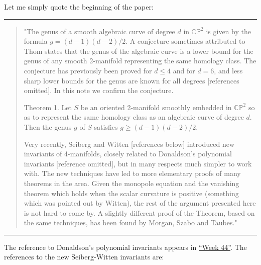 \documentclass{article}
\renewcommand{\texttt}[1]{%
  \begingroup
  \ttfamily
  \begingroup\lccode`~=`/\lowercase{\endgroup\def~}{/\discretionary{}{}{}}%
  \begingroup\lccode`~=`[\lowercase{\endgroup\def~}{[\discretionary{}{}{}}%
  \begingroup\lccode`~=`.\lowercase{\endgroup\def~}{.\discretionary{}{}{}}%
  \catcode`/=\active\catcode`[=\active\catcode`.=\active
  \scantokens{#1\noexpand}%
  \endgroup
}
\begin{document}
Let me simply quote the beginning of the paper:

\begin{center}\rule{0.5\linewidth}{0.5pt}\end{center}

\begin{quote}
"The genus of a smooth algebraic curve of degree \(d\) in
\(\mathbb{CP}^2\) is given by the formula \(g = (d-1)(d-2)/2\). A
conjecture sometimes attributed to Thom states that the genus of the
algebraic curve is a lower bound for the genus of any smooth 2-manifold
representing the same homology class. The conjecture has previously been
proved for \(d \leqslant 4\) and for \(d = 6\), and less sharp lower
bounds for the genus are known for all degrees {[}references omitted{]}.
In this note we confirm the conjecture.

Theorem 1. Let \(S\) be an oriented 2-manifold smoothly embedded in
\(\mathbb{CP}^2\) so as to represent the same homology class as an
algebraic curve of degree \(d\). Then the genus \(g\) of \(S\) satisfies
\(g \geqslant (d-1)(d-2)/2\).

Very recently, Seiberg and Witten {[}references below{]} introduced new
invariants of 4-manifolds, closely related to Donaldson's polynomial
invariants {[}reference omitted{]}, but in many respects much simpler to
work with. The new techniques have led to more elementary proofs of many
theorems in the area. Given the monopole equation and the vanishing
theorem which holds when the scalar curvature is positive (something
which was pointed out by Witten), the rest of the argument presented
here is not hard to come by. A slightly different proof of the Theorem,
based on the same techniques, has been found by Morgan, Szabo and
Taubes."
\end{quote}

\begin{center}\rule{0.5\linewidth}{0.5pt}\end{center}

The reference to Donaldson's polynomial invariants appears in
\protect\hyperlink{week44}{``Week 44''}. The references to the new
Seiberg-Witten invariants are:

\end{document}
